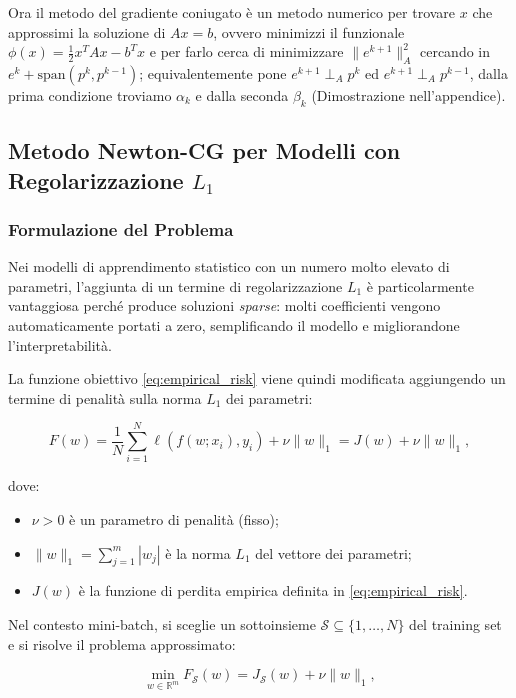 \documentclass[a4paper,12pt]{article}
\numberwithin{equation}{section}
\numberwithin{figure}{section}
\numberwithin{table}{section}
\begin{document}
Ora il metodo del gradiente coniugato è un metodo numerico per trovare \(x\) che approssimi la soluzione di \(Ax = b\), ovvero minimizzi il funzionale $
\phi(x) = \frac{1}{2}x^T A x - b^T x$
e per farlo cerca di minimizzare \(\|e^{k+1}\|_A^2\) cercando in \(e^k + \text{span}(p^k, p^{k-1})\); equivalentemente pone \(e^{k+1} \perp_A p^k\) ed \(e^{k+1} \perp_A p^{k-1}\), dalla prima condizione troviamo \(\alpha_k\) e dalla seconda \(\beta_k\) (Dimostrazione nell'appendice).
\newpage

\subsection{Metodo Newton-CG per Modelli con Regolarizzazione $L_1$}

\subsubsection{Formulazione del Problema}

Nei modelli di apprendimento statistico con un numero molto elevato di parametri,
l'aggiunta di un termine di regolarizzazione $L_1$ è particolarmente vantaggiosa
perché produce soluzioni \emph{sparse}: molti coefficienti vengono
automaticamente portati a zero, semplificando il modello e migliorandone
l'interpretabilità.

La funzione obiettivo \eqref{eq:empirical_risk} viene quindi modificata aggiungendo un termine di
penalità sulla norma $L_1$ dei parametri:

\begin{equation}
F(w) = \frac{1}{N}\sum_{i=1}^{N} \ell(f(w;x_i),y_i) + \nu \|w\|_1 = J(w) + \nu \|w\|_1, \tag{5.41}
\end{equation}

dove:
\begin{itemize}
    \item $\nu > 0$ è un parametro di penalità (fisso);
    \item $\|w\|_1 = \sum_{j=1}^{m} |w_j|$ è la norma $L_1$ del vettore dei parametri;
    \item $J(w)$ è la funzione di perdita empirica definita in \eqref{eq:empirical_risk}.
\end{itemize}

Nel contesto mini-batch, si sceglie un sottoinsieme $\mathcal{S} \subseteq \{1,\dots,N\}$
del training set e si risolve il problema approssimato:

\begin{equation}
\min_{w \in \mathbb{R}^m} F_{\mathcal{S}}(w) = J_{\mathcal{S}}(w) + \nu \|w\|_1, \tag{5.42}
\end{equation}
\end{document}
